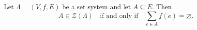 Let $\Lambda = (V, f, E)$ be a set system and let $A \subseteq E$. Then
$$A \in \mathcal{Z}(\Lambda) \quad \text{if and only if} \quad \sum_{e \in A} f(e) = \varnothing.$$
